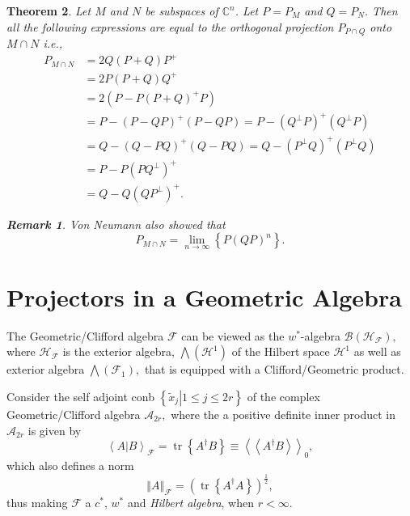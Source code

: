 \documentclass[aps,preprint]{revtex4}%
\newtheorem{theorem}{Theorem}
\newtheorem{remark}[theorem]{Remark}
\begin{document}
\begin{theorem}
Let $M$ and $N$ be subspaces of $\mathbb{C}^{n}$. Let $P=P_{M}$ and $Q=P_{N}$.
Then all the following expressions are equal to the orthogonal projection
$P_{P\cap Q}$ onto $M\cap N$ i.e.,
\begin{align}
P_{M\cap N}  &  =2Q\left(  P+Q\right)  P^{+}\\
&  =2P\left(  P+Q\right)  Q^{+}\\
&  =2\left(  P-P\left(  P+Q\right)  ^{+}P\right) \\
&  =P-\left(  P-QP\right)  ^{+}\left(  P-QP\right)  =P-\left(  Q^{\bot
}P\right)  ^{+}\left(  Q^{\bot}P\right) \\
&  =Q-\left(  Q-PQ\right)  ^{+}\left(  Q-PQ\right)  =Q-\left(  P^{\bot
}Q\right)  ^{+}\left(  P^{\bot}Q\right) \\
&  =P-P\left(  PQ^{\bot}\right)  ^{+}\\
&  =Q-Q\left(  QP^{\bot}\right)  ^{+}.
\end{align}


\begin{remark}
Von Neumann also showed that%
\begin{equation}
P_{M\cap N}=\lim\limits_{n\rightarrow\infty}\left\{  P\left(  QP\right)
^{n}\right\}  .
\end{equation}

\end{remark}
\end{theorem}

\section{Projectors in a Geometric Algebra}

The Geometric/Clifford algebra $\mathcal{F}$ can be viewed as the $w^{\ast}%
$-algebra $\mathcal{B}\left(  \mathcal{H}_{\mathcal{F}}\right)  ,$ where
$\mathcal{H}_{\mathcal{F}}$ is the exterior algebra, $%
{\textstyle\bigwedge}
\left(  \mathcal{H}^{1}\right)  $ of the Hilbert space $\mathcal{H}^{1}$ as
well as exterior algebra $%
{\textstyle\bigwedge}
\left(  \mathcal{F}_{1}\right)  ,$ that is equipped with a Clifford/Geometric product.

Consider the self adjoint conb $\left\{  \left.  \widetilde{x}_{j}\right\vert
1\leq j\leq2r\right\}  $ of the complex Geometric/Clifford algebra
$\mathcal{A}_{2r},$ where the a positive definite inner product in
$\mathcal{A}_{2r}$ is given by
\begin{equation}
\left\langle \left.  A\right\vert B\right\rangle _{\mathcal{F}}%
=\operatorname*{tr}\left\{  A^{\dagger}B\right\}  \equiv\left\langle
\left\langle A^{\dagger}B\right\rangle \right\rangle _{0},
\end{equation}
which also defines a norm
\begin{equation}
\left\Vert A\right\Vert _{\mathcal{F}}=\left(  \operatorname*{tr}\left\{
A^{\dagger}A\right\}  \right)  ^{\frac{1}{2}},
\end{equation}
thus making $\mathcal{F}$ a $c^{\ast}$, $w^{\ast}$ and \emph{Hilbert algebra},
when $r<\infty.$
\end{document}
